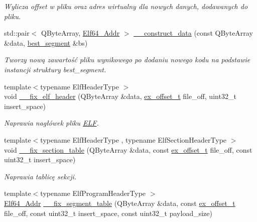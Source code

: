 \begin{DoxyCompactItemize}
\begin{DoxyCompactList}\small\item\em Wylicza offset w pliku oraz adres wirtualny dla nowych danych, dodawanych do pliku. \end{DoxyCompactList}\item 
std\-::pair$<$ Q\-Byte\-Array, \hyperlink{elf_8h_aeed51d08e3a950d637f8ec1f0cd4ef65}{Elf64\-\_\-\-Addr} $>$ \hyperlink{class_e_l_f_ac949a0fbd01c44004816c40cee240215}{\-\_\-\-\_\-construct\-\_\-data} (const Q\-Byte\-Array \&data, \hyperlink{class_e_l_f_acc32d4569fb28ff6c041c20870d8c2e7}{best\-\_\-segment} \&bs)
\begin{DoxyCompactList}\small\item\em Tworzy nową zawartość pliku wynikowego po dodaniu nowego kodu na podstawie instancji struktury best\-\_\-segment. \end{DoxyCompactList}\item 
{\footnotesize template$<$typename Elf\-Header\-Type $>$ }\\void \hyperlink{class_e_l_f_af9423cefdbd65754572e33d1afa0c434}{\-\_\-\-\_\-fix\-\_\-elf\-\_\-header} (Q\-Byte\-Array \&data, \hyperlink{elffile_8h_aa2125ab7570efd47d79e62488cfe0207}{ex\-\_\-offset\-\_\-t} file\-\_\-off, uint32\-\_\-t insert\-\_\-space)
\begin{DoxyCompactList}\small\item\em Naprawia nagłówek pliku \hyperlink{class_e_l_f}{E\-L\-F}. \end{DoxyCompactList}\item 
{\footnotesize template$<$typename Elf\-Header\-Type , typename Elf\-Section\-Header\-Type $>$ }\\void \hyperlink{class_e_l_f_a8df75db9989bc8bb05f46eab5852074e}{\-\_\-\-\_\-fix\-\_\-section\-\_\-table} (Q\-Byte\-Array \&data, const \hyperlink{elffile_8h_aa2125ab7570efd47d79e62488cfe0207}{ex\-\_\-offset\-\_\-t} file\-\_\-off, const uint32\-\_\-t insert\-\_\-space)
\begin{DoxyCompactList}\small\item\em Naprawia tablicę sekcji. \end{DoxyCompactList}\item 
{\footnotesize template$<$typename Elf\-Program\-Header\-Type $>$ }\\\hyperlink{elf_8h_aeed51d08e3a950d637f8ec1f0cd4ef65}{Elf64\-\_\-\-Addr} \hyperlink{class_e_l_f_ad2a54385657bf538ab3a7284106d7535}{\-\_\-\-\_\-fix\-\_\-segment\-\_\-table} (Q\-Byte\-Array \&data, const \hyperlink{elffile_8h_aa2125ab7570efd47d79e62488cfe0207}{ex\-\_\-offset\-\_\-t} file\-\_\-off, const uint32\-\_\-t insert\-\_\-space, const uint32\-\_\-t payload\-\_\-size)

\end{DoxyCompactItemize}
